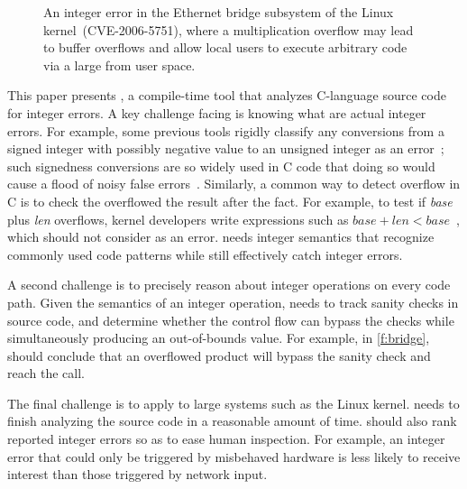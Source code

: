 \begin{figure}[t]
\centering

\vspace{-1em}
\caption{An integer error in the Ethernet bridge subsystem of the
Linux kernel~(CVE-2006-5751), where a multiplication overflow
may lead to buffer overflows and allow local users to execute
arbitrary code via a large  from user space.
}
\label{f:bridge}
\end{figure}

This paper presents \sys, a compile-time tool that analyzes C-language
source code for integer errors.
%
A key challenge facing \sys is knowing what are actual integer errors.  For
example, some previous tools rigidly classify any conversions from a
signed integer with possibly negative value to an unsigned integer
as an error~\cite{brumley:rich, moy:z3prefix, seacord:secure-c}; 
such signedness conversions are so widely used in C
code that doing so would cause a flood of noisy false
errors~\cite[\subsectionautorefname~6.2]{moy:z3prefix}.
Similarly, a common way to detect overflow in C is to 
check the overflowed the result after the fact. For example, to test
if \textit{base} plus \textit{len} overflows, kernel developers write
expressions such as $\mathit{base} + \mathit{len} < \mathit{base}$~\cite{ioc},
which \sys should not consider as an error.
\sys needs integer semantics that recognize commonly used code patterns
while still effectively catch integer errors.

A second challenge is to precisely reason about integer operations
on every code path.  Given the semantics of an integer operation,
\sys needs to track sanity checks in source code, and determine
whether the control flow can bypass the checks while simultaneously
producing an out-of-bounds value.  For example, in \autoref{f:bridge},
\sys should conclude that an overflowed product  will
bypass the sanity check and reach the  call.

The final challenge is to apply \sys to large systems such as the
Linux kernel.  \sys needs to finish analyzing the source code in a
reasonable amount of time.  \sys should also rank reported integer
errors so as to ease human inspection.  For example, an integer error
that could only be triggered by misbehaved hardware is
less likely to receive interest than those triggered by network input.

